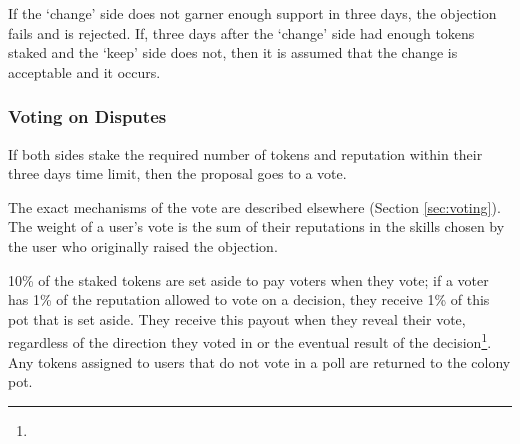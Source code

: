 If the `change' side does not garner enough support in three days, the objection fails and is rejected.
If, three days after the `change' side had enough tokens staked and the `keep' side does not, then it is assumed that the change is acceptable and it occurs.  %



\subsubsection{Voting on Disputes}
If both sides stake the required number of tokens and reputation within their three days time limit, then the proposal goes to a vote.

The exact mechanisms of the vote are described elsewhere (Section \ref{sec:voting}). The weight of a user's vote is the sum of their reputations in the skills chosen by the user who originally raised the objection.


10\% of the staked tokens are set aside to pay voters when they vote; if a voter has 1\% of the reputation allowed to vote on a decision, they receive 1\% of this pot that is set aside. They receive this payout when they reveal their vote, regardless of the direction they voted in or the eventual result of the decision\footnote{}. Any tokens assigned to users that do not vote in a poll are returned to the colony pot.


